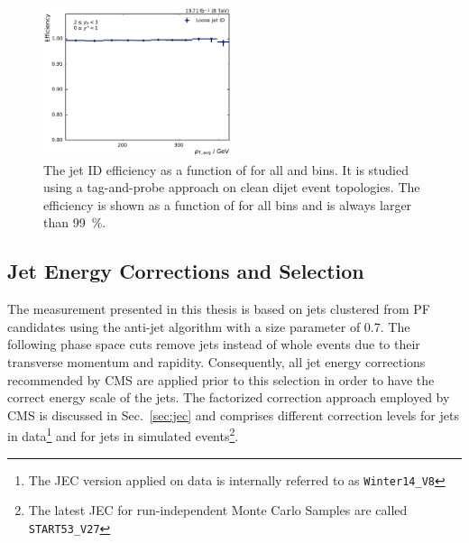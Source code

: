 \begin{figure}[htbp]
    \includegraphics[width=0.49\textwidth]{figures/measurement/jetideff_yb2ys0.pdf}
    \caption[Efficiency of the jet ID]{The jet ID efficiency as a function of
    \ptavg for all \ystar and \yboost bins. It is studied using a
    tag-and-probe approach on clean dijet event topologies. The efficiency is
    shown as a function of \ptavg for all bins and is always larger than
    \SI{99}{\percent}.}
    \label{fig:jetid_eff}
\end{figure}

\subsection{Jet Energy Corrections and Selection}

The measurement presented in this thesis is based on jets clustered from PF
candidates using the anti-\kt jet algorithm with a size parameter of 0.7. The
following phase space cuts remove jets instead of whole events due to their
transverse momentum and rapidity. Consequently, all jet energy corrections
recommended by CMS are applied prior to this selection in order to have the
correct energy scale of the jets. The factorized correction approach employed by
CMS is discussed in Sec.~\ref{sec:jec} and comprises different correction levels
for jets in data\footnote{The JEC version applied on data is internally referred
to as \texttt{Winter14\_V8}} and for jets in simulated events\footnote{The
latest JEC for run-independent Monte Carlo Samples are called
\texttt{START53\_V27}}.

